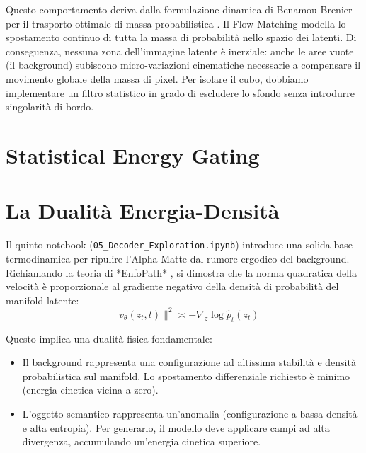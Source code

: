 \documentclass[12pt,a4paper]{report}
\begin{document}
Questo comportamento deriva dalla formulazione dinamica di Benamou-Brenier per il trasporto ottimale di massa probabilistica \cite{benamou2000computational}. Il Flow Matching modella lo spostamento continuo di tutta la massa di probabilità nello spazio dei latenti. Di conseguenza, nessuna zona dell'immagine latente è inerziale: anche le aree vuote (il background) subiscono micro-variazioni cinematiche necessarie a compensare il movimento globale della massa di pixel. Per isolare il cubo, dobbiamo implementare un filtro statistico in grado di escludere lo sfondo senza introdurre singolarità di bordo.

\section{Statistical Energy Gating}
\section{La Dualità Energia-Densità}
Il quinto notebook (\texttt{05\_Decoder\_Exploration.ipynb}) introduce una solida base termodinamica per ripulire l'Alpha Matte dal rumore ergodico del background. Richiamando la teoria di *EnfoPath* \cite{enfopath2025}, si dimostra che la norma quadratica della velocità è proporzionale al gradiente negativo della densità di probabilità del manifold latente:
\begin{equation}
    \|v_\theta(z_t, t)\|^2 \asymp -\nabla_z \log \hat{p}_t(z_t)
\end{equation}

Questo implica una dualità fisica fondamentale:
\begin{itemize}
    \item Il background rappresenta una configurazione ad altissima stabilità e densità probabilistica sul manifold. Lo spostamento differenziale richiesto è minimo (energia cinetica vicina a zero).
    \item L'oggetto semantico rappresenta un'anomalia (configurazione a bassa densità e alta entropia). Per generarlo, il modello deve applicare campi ad alta divergenza, accumulando un'energia cinetica superiore.
\end{itemize}
\end{document}
